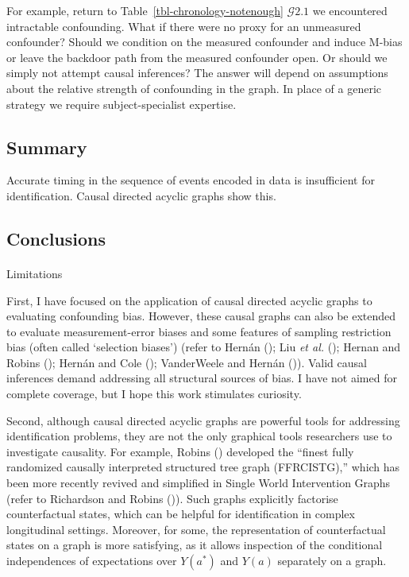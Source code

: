 \documentclass[
  single column]{article}
\makeatletter
\let\oldparagraph\paragraph
\renewcommand{\paragraph}{
    \@ifstar
      \xxxParagraphStar
      \xxxParagraphNoStar
  }
\newcommand{\xxxParagraphStar}[1]{\oldparagraph*{#1}\mbox{}}
\newcommand{\xxxParagraphNoStar}[1]{\oldparagraph{#1}\mbox{}}
\makeatother
\begin{document}
For example, return to Table~\ref{tbl-chronology-notenough}
\(\mathcal{G} 2.1\) we encountered intractable confounding. What if
there were no proxy for an unmeasured confounder? Should we condition on
the measured confounder and induce M-bias or leave the backdoor path
from the measured confounder open. Or should we simply not attempt
causal inferences? The answer will depend on assumptions about the
relative strength of confounding in the graph. In place of a generic
strategy we require subject-specialist expertise.

\subsection{Summary}\label{summary}

Accurate timing in the sequence of events encoded in data is
insufficient for identification. Causal directed acyclic graphs show
this.

\subsection{Conclusions}\label{conclusions}

\paragraph{Limitations}\label{limitations}

First, I have focused on the application of causal directed acyclic
graphs to evaluating confounding bias. However, these causal graphs can
also be extended to evaluate measurement-error biases and some features
of sampling restriction bias (often called `selection biases') (refer to
Hernán (); Liu
\emph{et al.} (); Hernan and
Robins (); Hernán and Cole
(); VanderWeele and Hernán
()). Valid causal
inferences demand addressing all structural sources of bias. I have not
aimed for complete coverage, but I hope this work stimulates curiosity.

Second, although causal directed acyclic graphs are powerful tools for
addressing identification problems, they are not the only graphical
tools researchers use to investigate causality. For example, Robins
() developed the ``finest fully
randomized causally interpreted structured tree graph (FFRCISTG),''
which has been more recently revived and simplified in Single World
Intervention Graphs (refer to Richardson and Robins
()). Such graphs
explicitly factorise counterfactual states, which can be helpful for
identification in complex longitudinal settings. Moreover, for some, the
representation of counterfactual states on a graph is more satisfying,
as it allows inspection of the conditional independences of expectations
over \(Y(a^*)\) and \(Y(a)\) separately on a graph.
\end{document}
